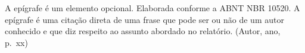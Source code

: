 A epígrafe é um elemento opcional. Elaborada conforme a ABNT NBR 10520. A
epígrafe é uma citação direta de uma frase que pode ser ou não de um autor
conhecido e que diz respeito ao assunto abordado no relatório. (Autor, ano,
p.~xx)

